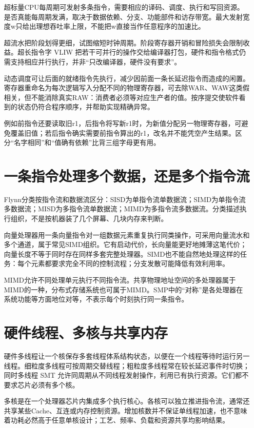 超标量CPU每周期可发射多条指令，需要相应的译码、调度、执行和写回资源。是否真能每周期发满，取决于数据依赖、分支、功能部件和访存带宽。最大发射宽度w只给出理想吞吐率上限，不能把w直接当作任意程序的加速比。

超流水把阶段划得更细，试图缩短时钟周期。阶段寄存器开销和冒险损失会限制收益。超长指令字 VLIW 把若干可并行的操作交给编译器打包，硬件和指令格式仍需支持相应并行执行，并非``只改编译器，硬件没有要求''。

动态调度可让后面的就绪指令先执行，减少因前面一条长延迟指令而造成的闲置。寄存器重命名为每次逻辑写入分配不同的物理寄存器，可去除WAR、WAW这类假相关，但不能消除真实RAW：消费者必须等对应生产者的值。按序提交使软件看到的状态仍符合程序顺序，并帮助实现精确异常。

例如前指令还要读取旧r1，后指令将写新r1时，为新值分配另一物理寄存器，可避免覆盖旧值；若后指令确实需要前指令算出的r1，改名并不能凭空产生结果。区分``名字相同''和``值确有依赖''比背三组字母更有用。

\section{一条指令处理多个数据，还是多个指令流}\label{CO05-flynn}

Flynn分类按指令流和数据流区分：SISD为单指令流单数据流；SIMD为单指令流多数据流；MISD为多指令流单数据流；MIMD为多指令流多数据流。分类描述执行组织，不是按机器装了几个屏幕、几块内存来判断。

向量处理器用一条向量指令对一组数据元素重复执行同类操作，可采用向量流水和多个通道，属于常见SIMD组织。它有启动代价，长向量能更好地摊薄这笔代价；向量长度不等于同时存在同样多套完整处理器。SIMD也不能自然地处理这样的任务：每个元素都要求完全不同的控制流程；分支发散可能降低有效利用率。

MIMD允许不同处理单元执行不同指令流。共享物理地址空间的多处理器属于MIMD的一种，分布式存储系统也可属于MIMD。SMP中的``对称''是各处理器在系统功能等方面地位对等，不表示每个时刻执行同一条指令。

\section{硬件线程、多核与共享内存}\label{CO05-multithread}

硬件多线程让一个核保存多套线程体系结构状态，以便在一个线程等待时运行另一线程。细粒度多线程可按周期交替线程；粗粒度多线程常在较长延迟事件时切换；同时多线程 SMT 允许同周期从不同线程发射操作，利用已有执行资源。它们都不要求芯片必须有多个核。

多核是在一个处理器芯片内集成多个执行核心。各核可以独立推进指令流，通常还共享某些Cache、互连或内存控制资源。增加核数并不保证单线程加速，也不意味着功耗必然高于任意单核设计；工艺、频率、负载和资源共享均影响结果。

